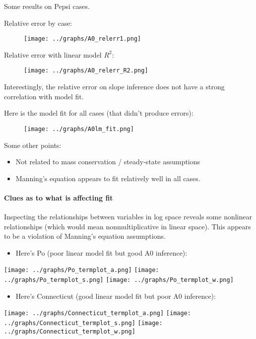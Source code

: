 \documentclass[]{article}
\providecommand{\tightlist}{%
  \setlength{\itemsep}{0pt}\setlength{\parskip}{0pt}}
\let\oldparagraph\paragraph
\renewcommand{\paragraph}[1]{\oldparagraph{#1}\mbox{}}
\begin{document}
Some results on Pepsi cases.

Relative error by case:

\begin{figure}
\centering
\texttt{[image: ../graphs/A0\_relerr1.png]}
\caption{}
\end{figure}

Relative error with linear model \(R^2\):

\begin{figure}
\centering
\texttt{[image: ../graphs/A0\_relerr\_R2.png]}
\caption{}
\end{figure}

Interestingly, the relative error on slope inference does not have a
strong correlation with model fit.

Here is the model fit for all cases (that didn't produce errors):

\begin{figure}
\centering
\texttt{[image: ../graphs/A0lm\_fit.png]}
\caption{}
\end{figure}

Some other points:

\begin{itemize}
\tightlist
\item
  Not related to mass conservation / steady-state assumptions
\item
  Manning's equation appears to fit relatively well in all cases.
\end{itemize}

\paragraph{Clues as to what is affecting
fit}\label{clues-as-to-what-is-affecting-fit}

Inspecting the relationships between variables in log space reveals some
nonlinear relationships (which would mean nonmultiplicative in linear
space). This appears to be a violation of Manning's equation
assumptions.

\begin{itemize}
\tightlist
\item
  Here's Po (poor linear model fit but good A0 inference):
\end{itemize}

\texttt{[image: ../graphs/Po\_termplot\_a.png]}
\texttt{[image: ../graphs/Po\_termplot\_s.png]}
\texttt{[image: ../graphs/Po\_termplot\_w.png]}

\begin{itemize}
\tightlist
\item
  Here's Connecticut (good linear model fit but poor A0 inference):
\end{itemize}

\texttt{[image: ../graphs/Connecticut\_termplot\_a.png]}
\texttt{[image: ../graphs/Connecticut\_termplot\_s.png]}
\texttt{[image: ../graphs/Connecticut\_termplot\_w.png]}
\end{document}
